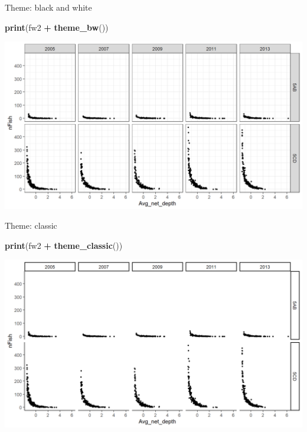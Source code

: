 \documentclass[
  ignorenonframetext,
]{beamer}
\newenvironment{Shaded}{\begin{snugshade}}{\end{snugshade}}
\newcommand{\KeywordTok}[1]{\textcolor[rgb]{0.13,0.29,0.53}{\textbf{#1}}}
\newcommand{\NormalTok}[1]{#1}
\newcommand{\OperatorTok}[1]{\textcolor[rgb]{0.81,0.36,0.00}{\textbf{#1}}}
\newcommand{\StringTok}[1]{\textcolor[rgb]{0.31,0.60,0.02}{#1}}
\begin{document}
\begin{frame}[fragile]{Theme: black and white}
\protect\hypertarget{theme-black-and-white}{}

\begin{Shaded}
\begin{Highlighting}[]
\KeywordTok{print}\NormalTok{(fw2 }\OperatorTok{+}\StringTok{ }\KeywordTok{theme_bw}\NormalTok{())}
\end{Highlighting}
\end{Shaded}

\begin{center}\includegraphics[width=0.8\linewidth]{figure/theme_2-1} \end{center}

\end{frame}

\begin{frame}[fragile]{Theme: classic}
\protect\hypertarget{theme-classic}{}

\begin{Shaded}
\begin{Highlighting}[]
\KeywordTok{print}\NormalTok{(fw2 }\OperatorTok{+}\StringTok{ }\KeywordTok{theme_classic}\NormalTok{())}
\end{Highlighting}
\end{Shaded}

\begin{center}\includegraphics[width=0.8\linewidth]{figure/theme_3-1} \end{center}

\end{frame}
\end{document}
